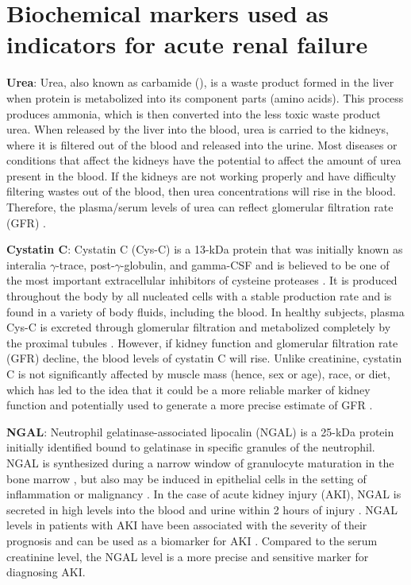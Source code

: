 \documentclass[11pt]{article}
\begin{document}
\section{Biochemical markers used as indicators for acute renal failure}
\begin{enumerate*}[{[a)]}]
    \item {
        \begin{enumerate*}[{[1)]}]
            \item \textbf{Urea}: Urea, also known as carbamide (), is a waste product formed in the liver when protein is metabolized into its component parts (amino acids). This process produces ammonia, which is then converted into the less toxic waste product urea. When released by the liver into the blood, urea is carried to the kidneys, where it is filtered out of the blood and released into the urine. Most diseases or conditions that affect the kidneys have the potential to affect the amount of urea present in the blood. If the kidneys are not working properly and have difficulty filtering wastes out of the blood, then urea concentrations will rise in the blood. Therefore, the plasma/serum levels of urea can reflect glomerular filtration rate (GFR) \citep{levey1999more}.
            \item \textbf{Cystatin C}: Cystatin C (Cys-C) is a 13-kDa protein that was initially known as interalia $\gamma$-trace, post-$\gamma$-globulin, and gamma-CSF and is believed to be one of the most important extracellular inhibitors of cysteine proteases \citep{vaidya2008biomarkers}. It is produced throughout the body by all nucleated cells with a stable production rate and is found in a variety of body fluids, including the blood. In healthy subjects, plasma Cys-C is excreted through glomerular filtration and metabolized completely by the proximal tubules \citep{de2012biomarkers}. However, if kidney function and glomerular filtration rate (GFR) decline, the blood levels of cystatin C will rise. Unlike creatinine, cystatin C is not significantly affected by muscle mass (hence, sex or age), race, or diet, which has led to the idea that it could be a more reliable marker of kidney function and potentially used to generate a more precise estimate of GFR \citep{dharnidharka2002serum, roos2007diagnostic}. 
            \item \textbf{NGAL}: Neutrophil gelatinase-associated lipocalin (NGAL) is a 25-kDa protein initially identified bound to gelatinase in specific granules of the neutrophil. NGAL is synthesized during a narrow window of granulocyte maturation in the bone marrow \citep{borregaard1995biosynthesis}, but also may be induced in epithelial cells in the setting of inflammation or malignancy \citep{nielsen1996induction}. In the case of acute kidney injury (AKI), NGAL is secreted in high levels into the blood and urine within 2 hours of injury \citep{bennett2008urine}. NGAL levels in patients with AKI have been associated with the severity of their prognosis and can be used as a biomarker for AKI \citep{han2009urinary}. Compared to the serum creatinine level, the NGAL level is a more precise and sensitive marker for diagnosing AKI. 

\end{enumerate*}}
\end{enumerate*}
\end{document}
